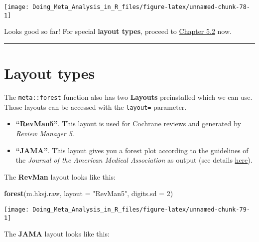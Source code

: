 \documentclass[]{book}
\newenvironment{Shaded}{\begin{snugshade}}{\end{snugshade}}
\newcommand{\KeywordTok}[1]{\textcolor[rgb]{0.13,0.29,0.53}{\textbf{#1}}}
\newcommand{\DataTypeTok}[1]{\textcolor[rgb]{0.13,0.29,0.53}{#1}}
\newcommand{\DecValTok}[1]{\textcolor[rgb]{0.00,0.00,0.81}{#1}}
\newcommand{\StringTok}[1]{\textcolor[rgb]{0.31,0.60,0.02}{#1}}
\newcommand{\NormalTok}[1]{#1}
\providecommand{\tightlist}{%
  \setlength{\itemsep}{0pt}\setlength{\parskip}{0pt}}
\theoremstyle{definition}
\theoremstyle{definition}
\theoremstyle{definition}
\theoremstyle{remark}
\begin{document}
\begin{center}\texttt{[image: Doing\_Meta\_Analysis\_in\_R\_files/figure-latex/unnamed-chunk-78-1]} \end{center}

Looks good so far! For special \textbf{layout types}, proceed to
\protect\hyperlink{layouttypes}{Chapter 5.2} now.

\begin{center}\rule{0.5\linewidth}{\linethickness}\end{center}

\hypertarget{layouttypes}{\section{Layout types}\label{layouttypes}}

The \texttt{meta::forest} function also has two \textbf{Layouts}
preinstalled which we can use. Those layouts can be accessed with the
\texttt{layout=} parameter.

\begin{itemize}
\tightlist
\item
  \textbf{``RevMan5''}. This layout is used for Cochrane reviews and
  generated by \emph{Review Manager 5}.
\item
  \textbf{``JAMA''}. This layout gives you a forest plot according to
  the guidelines of the \emph{Journal of the American Medical
  Association} as output (see details
  \href{https://jamanetwork.com/journals/jama/pages/instructions-for-authors}{here}).
\end{itemize}

The \textbf{RevMan} layout looks like this:

\begin{Shaded}
\begin{Highlighting}[]
\KeywordTok{forest}\NormalTok{(m.hksj.raw,}
       \DataTypeTok{layout =} \StringTok{"RevMan5"}\NormalTok{,}
       \DataTypeTok{digits.sd =} \DecValTok{2}\NormalTok{)}
\end{Highlighting}
\end{Shaded}

\begin{center}\texttt{[image: Doing\_Meta\_Analysis\_in\_R\_files/figure-latex/unnamed-chunk-79-1]} \end{center}

The \textbf{JAMA} layout looks like this:

\begin{Shaded}
\end{Shaded}
\end{document}
